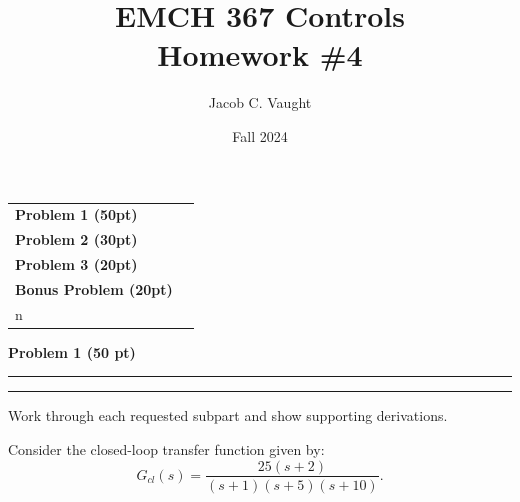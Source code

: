 \documentclass[12pt]{article}
\title{EMCH 367 Controls \\ Homework \#4}
\author{Jacob C. Vaught}
\date{Fall 2024}
\newcommand{\question}[1]{%
  \clearpage
  \vspace{0.5cm}
  {\noindent\normalsize \textbf{#1}}
  \vspace{0.2cm}
  \hrule
  \vspace{0.1cm}
  \hrule
  \vspace{0.3cm}
}
\begin{document}
\maketitle
\setlength{\parindent}{0pt}

\begin{center}
\begin{tcolorbox}[colback=white, colframe=gray!50!black, colbacktitle=gray!20!white,
                  coltitle=black, sharp corners, boxrule=1pt,
                  title=\Large\bfseries Table of Contents]
\begin{tabular}{p{}r}
\textbf{Problem 1 (50pt)} \dotfill & \textbf{\pageref{quest:1}} \\[0.3em]
\textbf{Problem 2 (30pt)} \dotfill & \textbf{\pageref{quest:2}} \\[0.3em]
\textbf{Problem 3 (20pt)} \dotfill & \textbf{\pageref{quest:3}} \\[0.3em]
\textbf{Bonus Problem (20pt)} \dotfill & \textbf{\pageref{quest:4}} \\n\end{tabular}
\vspace{0.2cm}
\end{tcolorbox}
\end{center}


\question{Problem 1 (50 pt)}\label{quest:1}
\begin{stepbox}
Work through each requested subpart and show supporting derivations.
\end{stepbox}

Consider the closed-loop transfer function given by:
\[
G_{cl}(s) = \frac{25(s + 2)}{(s + 1)(s + 5)(s + 10)}.
\]
\end{document}
